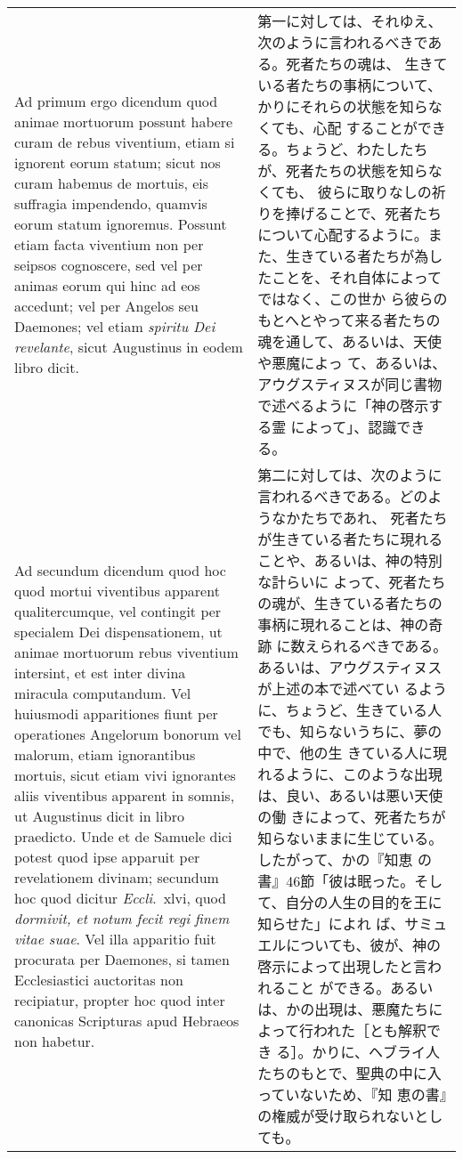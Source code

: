 \documentclass[10pt]{jsarticle} %
\begin{document}
\begin{longtable}{p{21em}p{21em}}
\\




{\sc Ad primum ergo dicendum} quod animae mortuorum possunt habere
curam de rebus viventium, etiam si ignorent eorum statum; sicut nos
curam habemus de mortuis, eis suffragia impendendo, quamvis eorum
statum ignoremus. Possunt etiam facta viventium non per seipsos
cognoscere, sed vel per animas eorum qui hinc ad eos accedunt; vel per
Angelos seu Daemones; vel etiam {\it spiritu Dei revelante}, sicut
Augustinus in eodem libro dicit.

&

第一に対しては、それゆえ、次のように言われるべきである。死者たちの魂は、
生きている者たちの事柄について、かりにそれらの状態を知らなくても、心配
することができる。ちょうど、わたしたちが、死者たちの状態を知らなくても、
彼らに取りなしの祈りを捧げることで、死者たちについて心配するように。ま
た、生きている者たちが為したことを、それ自体によってではなく、この世か
ら彼らのもとへとやって来る者たちの魂を通して、あるいは、天使や悪魔によっ
て、あるいは、アウグスティヌスが同じ書物で述べるように「神の啓示する霊
によって」、認識できる。

\\




{\sc Ad secundum dicendum} quod hoc quod mortui viventibus apparent
qualitercumque, vel contingit per specialem Dei dispensationem, ut
animae mortuorum rebus viventium intersint, et est inter divina
miracula computandum.  Vel huiusmodi apparitiones fiunt per
operationes Angelorum bonorum vel malorum, etiam ignorantibus mortuis,
sicut etiam vivi ignorantes aliis viventibus apparent in somnis, ut
Augustinus dicit in libro praedicto.  Unde et de Samuele dici potest
quod ipse apparuit per revelationem divinam; secundum hoc quod dicitur
{\it Eccli}.~{\sc xlvi}, quod {\it dormivit, et notum fecit regi finem
vitae suae}.  Vel illa apparitio fuit procurata per Daemones, si tamen
Ecclesiastici auctoritas non recipiatur, propter hoc quod inter
canonicas Scripturas apud Hebraeos non habetur.

&


第二に対しては、次のように言われるべきである。どのようなかたちであれ、
死者たちが生きている者たちに現れることや、あるいは、神の特別な計らいに
よって、死者たちの魂が、生きている者たちの事柄に現れることは、神の奇跡
に数えられるべきである。あるいは、アウグスティヌスが上述の本で述べてい
るように、ちょうど、生きている人でも、知らないうちに、夢の中で、他の生
きている人に現れるように、このような出現は、良い、あるいは悪い天使の働
きによって、死者たちが知らないままに生じている。したがって、かの『知恵
の書』46節「彼は眠った。そして、自分の人生の目的を王に知らせた」によれ
ば、サミュエルについても、彼が、神の啓示によって出現したと言われること
ができる。あるいは、かの出現は、悪魔たちによって行われた［とも解釈でき
る］。かりに、ヘブライ人たちのもとで、聖典の中に入っていないため、『知
恵の書』の権威が受け取られないとしても。



\end{longtable}
\end{document}
